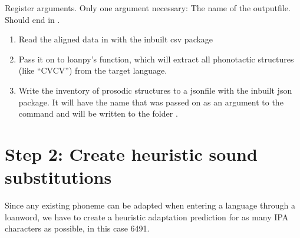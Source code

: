 \documentclass[letterpaper,10pt,english]{sphinxmanual}
\begin{document}
{{{{\begin{fulllineitems}
\label{\detokenize{mkloanpy:ronataswestoldturkiccommands.mineEAHinvs.register}}
\pysigstartsignatures
{}
\pysigstopsignatures
\sphinxAtStartPar
Register arguments. Only one argument necessary: The name of the
output\sphinxhyphen{}file. Should end in .

\end{fulllineitems}


\begin{fulllineitems}
\label{\detokenize{mkloanpy:ronataswestoldturkiccommands.mineEAHinvs.run}}
\pysigstartsignatures
{}
\pysigstopsignatures\begin{enumerate}
%
\item {} 
\sphinxAtStartPar
Read the aligned data in  with the
inbuilt csv package

\item {} 
\sphinxAtStartPar
Pass it on to loanpy’s 
function, which will extract all phonotactic structures (like “CVCV”)
from the target language.

\item {} 
\sphinxAtStartPar
Write the inventory of prosodic structures to a json\sphinxhyphen{}file with the
inbuilt json package. It will have the name that was passed on as an
argument to the command and will be written to the folder .

\end{enumerate}

\end{fulllineitems}



\section{Step 2: Create heuristic sound substitutions}
\label{\detokenize{mkloanpy:step-2-create-heuristic-sound-substitutions}}
\sphinxAtStartPar
Since any existing phoneme can be adapted when entering a language through
a loanword, we have to create a heuristic adaptation prediction for as many
IPA characters as possible, in this case 6491.

}}}}
\end{document}
